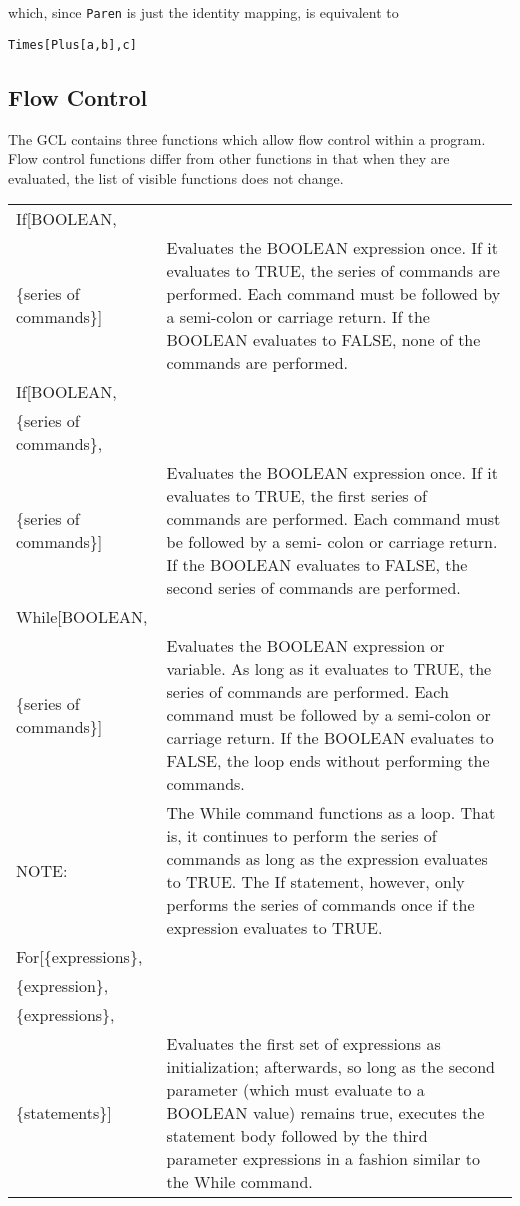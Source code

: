 \noindent
which, since \verb+Paren+ is just the identity mapping, is equivalent to
\begin{verbatim}
Times[Plus[a,b],c]
\end{verbatim}

\subsection{Flow Control}

The GCL contains three functions which allow flow control within a
program.  Flow control functions differ from other functions in that
when they are evaluated, the list of visible functions does not
change.

\medskip

\begin{tabular}{lp{4in}}
If[BOOLEAN, & \\
\{series of commands\}] & Evaluates the BOOLEAN expression
once. If it evaluates to TRUE, the series of commands are performed.
Each command must be followed by a semi-colon or carriage return.  If
the BOOLEAN evaluates to FALSE, none of the commands are performed.\\
If[BOOLEAN, & \\
\{series of commands\}, & \\
\{series of commands\}] & Evaluates the BOOLEAN expression
once. If it evaluates to TRUE, the first series of commands are
performed.  Each command must be followed by a semi- colon or carriage
return.  If the BOOLEAN evaluates to FALSE, the second series of
commands are performed. \\
While[BOOLEAN, &\\
\{series of commands\}] & Evaluates the BOOLEAN
expression or variable.  As long as it evaluates to TRUE, the series
of commands are performed.  Each command must be followed by a
semi-colon or carriage return.  If the BOOLEAN evaluates to FALSE, the
loop ends without performing the commands.\\
NOTE: & The While command functions as a
loop.  That is, it continues to perform the series of commands as long
as the expression evaluates to TRUE.  The If statement, however, only
performs the series of commands once if the expression evaluates to
TRUE.\\
For[\{expressions\}, & \\
\{expression\}, & \\
\{expressions\}, & \\
\{statements\}] & Evaluates the first set of expressions as initialization;
afterwards, so long as the second parameter (which must evaluate to a 
BOOLEAN value) remains true, executes the statement body followed by the
third parameter expressions in a fashion similar to the While command.
\end{tabular}


